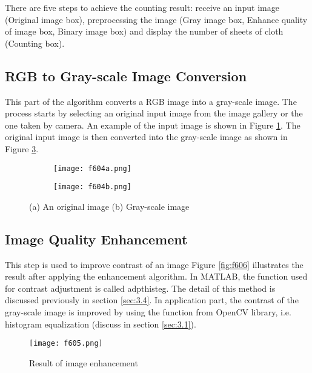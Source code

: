 There are five steps to achieve the counting result: receive an input image (Original image box), preprocessing the image (Gray image box, Enhance quality of image box, Binary image box) and display the number of sheets of cloth (Counting box).

\subsection{RGB to Gray-scale Image Conversion}
This part of the algorithm converts a RGB image into a gray-scale image. The process starts by selecting an original input image from the image gallery or the one taken by camera. An example of the input image is shown in Figure \ref{fig:f604a}. The original input image is then converted into the gray-scale image as shown in Figure \ref{fig:f604b}. 
\begin{figure}[t]
	\centering
	\begin{subfigure}[b]{0.3\textwidth}
		\texttt{[image: f604a.png]}
		\caption{}\label{fig:f604a}
	\end{subfigure}
	\begin{subfigure}[b]{0.3\textwidth}
		\texttt{[image: f604b.png]}
		\caption{}\label{fig:f604b}
	\end{subfigure}
	\caption{(a) An original image (b) Gray-scale image}
\end{figure}
\subsection{Image Quality Enhancement}
This step is used to improve contrast of an image Figure \ref{fig:f606} illustrates the result after applying the enhancement algorithm. In MATLAB, the function used for contrast adjustment is called adpthisteg. The detail of this method is discussed previously in section \ref{sec:3.4}. In application part, the contrast of the gray-scale image is improved by using the function from OpenCV library, i.e. histogram equalization (discuss in section \ref{sec:3.1}).
\begin{figure}[t]
	\centering
	\texttt{[image: f605.png]}
	\caption{Result of image enhancement}
	\label{fig:f605}
\end{figure}


